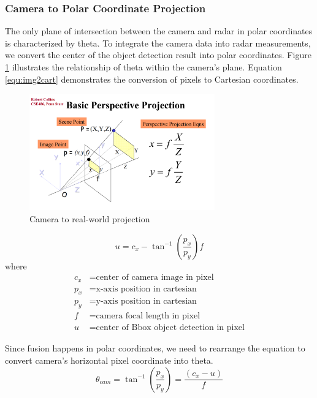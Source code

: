 \subsubsection{Camera to Polar Coordinate Projection}
The only plane of intersection between the camera and radar in polar coordinates is characterized by theta. 
To integrate the camera data into radar measurements, 
we convert the center of the object detection result into polar coordinates. 
Figure \ref{fig:camera_projection} illustrates the relationship of theta within the camera's plane. 
Equation \ref{equ:img2cart} demonstrates the conversion of pixels to Cartesian coordinates.
\begin{figure}[hpbt]
    \centering
    \includegraphics[width=8cm]{Figures/cam_projection.png}%
    \caption{Camera to real-world projection}
    \label{fig:camera_projection}
\end{figure}

\begin{equation}\label{equ:img2cart}
u=c_x-\tan^{-1}(\frac{p_x}{p_y})f
\end{equation}
where
\begin{align*}
    c_x &=\text{center of camera image in pixel}\\
    p_x &=\text{x-axis position in cartesian}\\
    p_y &=\text{y-axis position in cartesian}\\
    f &=\text{camera focal length in pixel}\\
    u &=\text{center of Bbox object detection in pixel}
\end{align*}

Since fusion happens in polar coordinates, we need to rearrange the equation to convert camera's horizontal pixel coordinate into theta.
\begin{equation}\label{equ:2_cam_px}
    \theta_{cam}=
    \tan^{-1}(\frac{p_x}{p_y})=
    \frac
    {(c_x-u)}
    {f}
\end{equation}
\fi
\newpage
